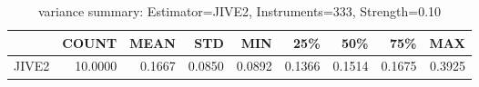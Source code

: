 \begin{table}[ht]
\centering
\caption{variance summary: Estimator=JIVE2, Instruments=333, Strength=0.10}
\begin{tabular}{lrrrrrrrr}
\toprule
 & COUNT & MEAN & STD & MIN & 25\% & 50\% & 75\% & MAX \\
\midrule
JIVE2 & 10.0000 & 0.1667 & 0.0850 & 0.0892 & 0.1366 & 0.1514 & 0.1675 & 0.3925 \\
\bottomrule
\end{tabular}
\end{table}
